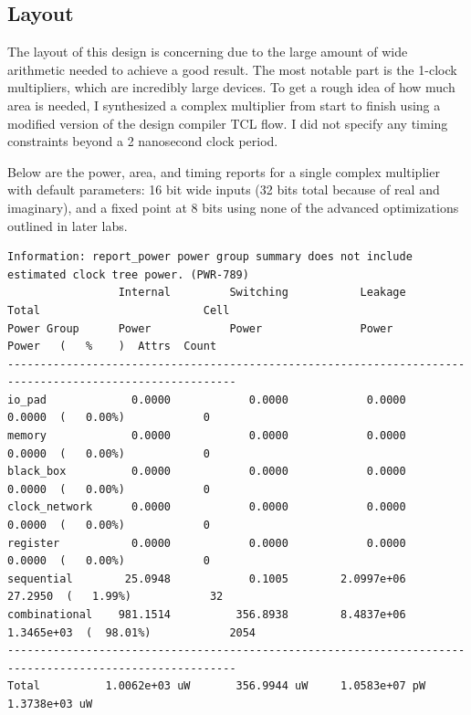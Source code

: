 \documentclass[12pt]{article}
\begin{document}
\subsection{Layout}
The layout of this design is concerning due to the large amount of wide
arithmetic needed to achieve a good result. The most notable part is the
1-clock multipliers, which are incredibly large devices. To get a rough idea of
how much area is needed, I synthesized a complex multiplier from start to
finish using a modified version of the design compiler TCL flow. I did not
specify any timing constraints beyond a 2 nanosecond clock period.

Below are the power, area, and timing reports for a single complex multiplier
with default parameters: 16 bit wide inputs (32 bits total because of real and
imaginary), and a fixed point at 8 bits using none of the advanced
optimizations outlined in later labs.

\begin{verbatim}
Information: report_power power group summary does not include estimated clock tree power. (PWR-789)
                 Internal         Switching           Leakage            Total                         Cell
Power Group      Power            Power               Power              Power   (   %    )  Attrs  Count
---------------------------------------------------------------------------------------------------------
io_pad             0.0000            0.0000            0.0000            0.0000  (   0.00%)            0
memory             0.0000            0.0000            0.0000            0.0000  (   0.00%)            0
black_box          0.0000            0.0000            0.0000            0.0000  (   0.00%)            0
clock_network      0.0000            0.0000            0.0000            0.0000  (   0.00%)            0
register           0.0000            0.0000            0.0000            0.0000  (   0.00%)            0
sequential        25.0948            0.1005        2.0997e+06           27.2950  (   1.99%)            32
combinational    981.1514          356.8938        8.4837e+06        1.3465e+03  (  98.01%)            2054
---------------------------------------------------------------------------------------------------------
Total          1.0062e+03 uW       356.9944 uW     1.0583e+07 pW     1.3738e+03 uW
\end{verbatim}
\end{document}
